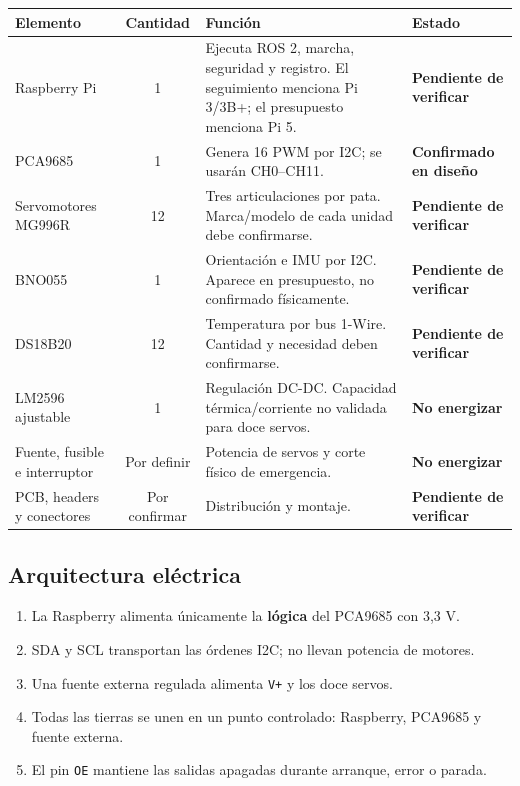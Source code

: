 \documentclass[11pt,a4paper]{article}
\newcommand{\ok}{\textcolor{green!45!black}{\textbf{Confirmado en diseño}}}
\newcommand{\pending}{\textcolor{orange!80!black}{\textbf{Pendiente de verificar}}}
\newcommand{\blocked}{\textcolor{red!75!black}{\textbf{No energizar}}}
\newcommand{\code}[1]{\texttt{#1}}
\begin{document}
\begin{tabularx}{\textwidth}{l c X l}
\toprule
\textbf{Elemento} & \textbf{Cantidad} & \textbf{Función} & \textbf{Estado}\\
\midrule
Raspberry Pi & 1 & Ejecuta ROS 2, marcha, seguridad y registro. El seguimiento menciona Pi 3/3B+; el presupuesto menciona Pi 5. & \pending\\
PCA9685 & 1 & Genera 16 PWM por I2C; se usarán CH0--CH11. & \ok\\
Servomotores MG996R & 12 & Tres articulaciones por pata. Marca/modelo de cada unidad debe confirmarse. & \pending\\
BNO055 & 1 & Orientación e IMU por I2C. Aparece en presupuesto, no confirmado físicamente. & \pending\\
DS18B20 & 12 & Temperatura por bus 1-Wire. Cantidad y necesidad deben confirmarse. & \pending\\
LM2596 ajustable & 1 & Regulación DC-DC. Capacidad térmica/corriente no validada para doce servos. & \blocked\\
Fuente, fusible e interruptor & Por definir & Potencia de servos y corte físico de emergencia. & \blocked\\
PCB, headers y conectores & Por confirmar & Distribución y montaje. & \pending\\
\bottomrule
\end{tabularx}

\subsection{Arquitectura eléctrica}

\begin{enumerate}[leftmargin=8mm]
\item La Raspberry alimenta únicamente la \textbf{lógica} del PCA9685 con 3,3 V.
\item SDA y SCL transportan las órdenes I2C; no llevan potencia de motores.
\item Una fuente externa regulada alimenta \code{V+} y los doce servos.
\item Todas las tierras se unen en un punto controlado: Raspberry, PCA9685 y fuente externa.
\item El pin \code{OE} mantiene las salidas apagadas durante arranque, error o parada.
\end{enumerate}

\begin{center}
\end{center}
\end{document}

